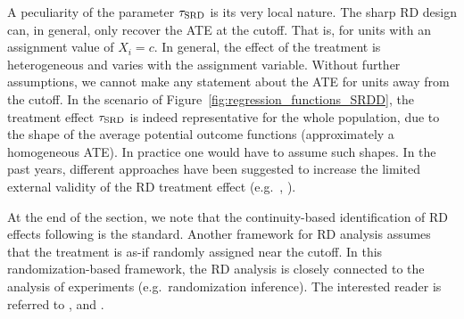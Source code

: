 A peculiarity of the parameter $\tau_{\textup{SRD}}$ is its very local nature.
The sharp RD design can, in general, only recover the ATE at the cutoff.
That is, for units with an assignment value of $X_i = c$.
In general, the effect of the treatment is heterogeneous and varies with the assignment variable.
Without further assumptions, we cannot make any statement about the ATE for units away from the cutoff.
In the scenario of Figure~\ref{fig:regression_functions_SRDD}, the treatment effect $\tau_{\textup{SRD}}$ is indeed representative for the whole population,
due to the shape of the average potential outcome functions (approximately a homogeneous ATE).
In practice one would have to assume such shapes.
In the past years, different approaches have been suggested to increase the limited external validity of the RD treatment effect
(e.g.\ \textcite{Angrist_2015}, \textcite{Bertanha_2020}).

At the end of the section, we note that the continuity-based identification of RD effects following \textcite{Hahn_2001} is the standard.
Another framework for RD analysis assumes that the treatment is as-if randomly assigned near the cutoff.
In this randomization-based framework, the RD analysis is closely connected to the analysis of experiments (e.g.\ randomization inference).
The interested reader is referred to \textcite{Lee_2008}, and \textcite{Sekhon_2017}. 